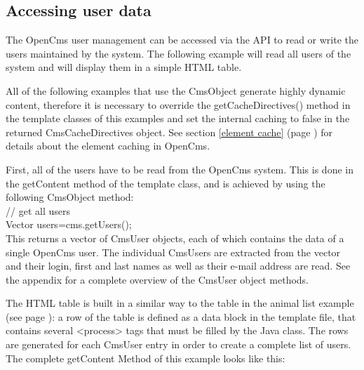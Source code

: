 \subsection{Accessing user data}

The OpenCms user management can be accessed via the API to read or
write the users maintained by the system. The following example will
read all users of the system and will display them in a simple HTML
table. 

All of the following examples that use the CmsObject generate highly dynamic
content, therefore it is necessary to override the {\meth getCacheDirectives()} 
method in the template classes of this examples and set the internal caching
to false in the returned {\class CmsCacheDirectives} 
object. See section \ref{element cache} (page \pageref{element cache})
for details about the element caching in OpenCms.

First, all of the users have to be read from the OpenCms system. This
is done in the {\meth getContent} method of the template class, and is achieved
by using the following {\meth CmsObject} method:\\


{\meth // get all users\\

Vector users=cms.getUsers();}\\

This returns a vector of {\name CmsUser} objects, each of which contains the
data of a single OpenCms user. The individual {\name CmsUsers} are extracted from the
vector and their login, first and last names as well as their e-mail
address are read. See the appendix for a complete overview of the
{\name CmsUser} object methods.

The HTML table is built in a similar way to the table in the animal
list example (see page \pageref{animal list example}): 
a row of the table is defined as a data block in the
template file, that contains several {\tag <process>} tags that must be
filled by the Java class. The rows are generated for each {\name CmsUser}
entry in order to create a complete list of users.\\

The complete getContent Method of this example looks like this:\\

